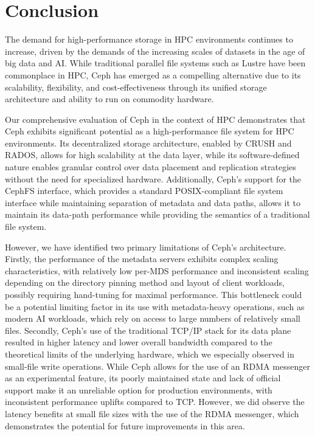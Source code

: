 \pagebreak
\section{Conclusion}
\label{sec:conclusion}

The demand for high-performance storage in \ac{HPC} environments continues to increase, driven by the demands of the increasing scales of datasets in the age of big data and \ac{AI}. While traditional parallel file systems such as Lustre have been commonplace in \ac{HPC}, Ceph has emerged as a compelling alternative due to its scalability, flexibility, and cost-effectiveness through its unified storage architecture and ability to run on commodity hardware.

Our comprehensive evaluation of Ceph in the context of \ac{HPC} demonstrates that Ceph exhibits significant potential as a high-performance file system for \ac{HPC} environments. Its decentralized storage architecture, enabled by \ac{CRUSH} and \ac{RADOS}, allows for high scalability at the data layer, while its software-defined nature enables granular control over data placement and replication strategies without the need for specialized hardware. Additionally, Ceph's support for the \ac{CephFS} interface, which provides a standard \acs{POSIX}-compliant file system interface while maintaining separation of metadata and data paths, allows it to maintain its data-path performance while providing the semantics of a traditional file system.

However, we have identified two primary limitations of Ceph's architecture. Firstly, the performance of the metadata servers exhibits complex scaling characteristics, with relatively low per-\acs{MDS} performance and inconsistent scaling depending on the directory pinning method and layout of client workloads, possibly requiring hand-tuning for maximal performance. This bottleneck could be a potential limiting factor in its use with metadata-heavy operations, such as modern \ac{AI} workloads, which rely on access to large numbers of relatively small files. Secondly, Ceph's use of the traditional \ac{TCP/IP} stack for its data plane resulted in higher latency and lower overall bandwidth compared to the theoretical limits of the underlying hardware, which we especially observed in small-file write operations. While Ceph allows for the use of an \acs{RDMA} messenger as an experimental feature, its poorly maintained state and lack of official support make it an unreliable option for production environments, with inconsistent performance uplifts compared to \ac{TCP}. However, we did observe the latency benefits at small file sizes with the use of the \ac{RDMA} messenger, which demonstrates the potential for future improvements in this area.

